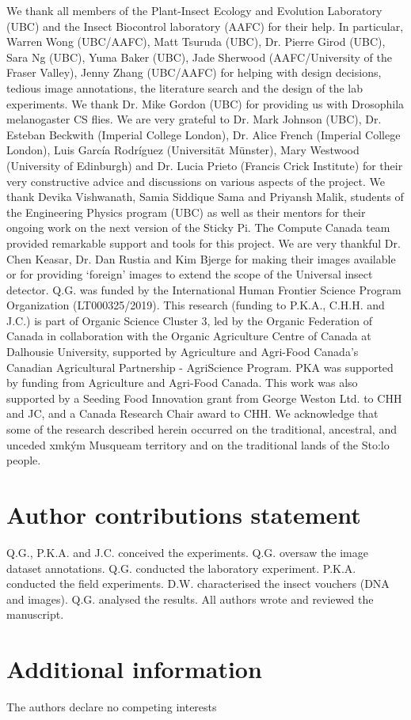 \documentclass[12pt]{article}
\newcommand{\musqueam}{x\super{w}m\textschwa{}\texttheta{}k\super{w}\textschwa{}\'{y}\textschwa{}m}
\begin{document}
\begin{linenumbers}
{			We thank all members of the Plant-Insect Ecology and Evolution Laboratory (UBC) and the Insect Biocontrol laboratory (AAFC) for their help. In particular, Warren Wong (UBC/AAFC), Matt Tsuruda (UBC), Dr. Pierre Girod (UBC), Sara Ng (UBC), Yuma Baker (UBC), Jade Sherwood (AAFC/University of the Fraser Valley), Jenny Zhang (UBC/AAFC) for helping with design decisions, tedious image annotations, the literature search and the design of the lab experiments. We thank Dr. Mike Gordon (UBC) for providing us with Drosophila melanogaster CS flies. We are very grateful to Dr. Mark Johnson (UBC), Dr. Esteban Beckwith (Imperial College London), Dr. Alice French (Imperial College London), Luis García Rodríguez (Universität Münster), Mary Westwood (University of Edinburgh) and Dr. Lucia Prieto (Francis Crick Institute) for their very constructive advice and discussions on various aspects of the project. We thank Devika Vishwanath, Samia Siddique Sama and Priyansh Malik, students of the Engineering Physics program (UBC) as well as their mentors for their ongoing work on the next version of the Sticky Pi. The Compute Canada team provided remarkable support and tools for this project. 
			We are very thankful Dr. Chen Keasar, 
			Dr. Dan Rustia \cite{rustia_application_2020}and 
			Kim Bjerge\cite{bjerge_automated_2021}
			for making their images available 
			or for providing `foreign' images to extend the scope of the Universal insect detector.
			Q.G. was funded by the International Human Frontier Science Program Organization (LT000325/2019). This research (funding to P.K.A., C.H.H. and J.C.) is part of Organic Science Cluster 3, led by the Organic Federation of Canada in collaboration with the Organic Agriculture Centre of Canada at Dalhousie University, supported by Agriculture and Agri-Food Canada’s Canadian Agricultural Partnership - AgriScience Program. PKA was supported by funding from Agriculture and Agri-Food Canada. This work was also supported by a Seeding Food Innovation grant from George Weston Ltd. to CHH and JC, and a Canada Research Chair award to CHH. We acknowledge that some of the research described herein occurred on the traditional, ancestral, and unceded \musqueam{} Musqueam territory and on the traditional lands of the Sto:lo people.}
		
		\section*{Author contributions statement}
		Q.G., P.K.A. and J.C. conceived the experiments.
		Q.G. oversaw the image dataset annotations.
		Q.G. conducted the laboratory experiment. 
		P.K.A. conducted the field experiments.
		D.W. characterised the insect vouchers (DNA and images).
		Q.G. analysed the results.
		All authors wrote and reviewed the manuscript. 
		
		\section*{Additional information}
		The authors declare no competing interests
		
		
	\end{linenumbers}
	{
		
		
	}
	
\end{document}
